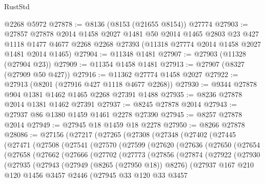 \begin{lexlean}{RustStd}
\begin{coremodule}
{\begin{coremodule}
{{{{{{{{{{{{{{{{{{{{{{{{{{{{{{{{{{{{{{{{{{{{{{{{{{{{{{    @2268
    @5972
@27878 := @8136 (@8153 (@21655 @8154)) @27774
@27903 := @27857
    @27878
    @2014
    @1458
    @2027
    @1481
    @50
    @2014
    @1465
    @2803
    @23
    @427
    @1118
    @1477
    @4677
    @2268
    @2268
    @27393
    (@11318 @27774 @2014 @1458 @2027 @1481 @2014 @1465)
@27904 := @11348 @1481
@27907 := @27903 (@11328 (@27904 @23))
@27909 := @11354 @1458 @1481
@27913 := @27907 (@8327 (@27909 @50 @427))
@27916 := @11362 @27774 @1458 @2027
@27922 := @27913 (@8201 (@27916 @427 @1118 @4677 @2268))
@27930 := @9344 @27878 @904 @1381 @1462 @1465 @2268 @27391 @1488
@27935 := @8236 @27878 @2014 @1381 @1462 @27391
@27937 := @8245 @27878 @2014
@27943 := @27937 @86 @1380 @1459 @1461 @2278 @27390
@27945 := @8257 @27878 @2014
@27949 := @27945 @18 @1459 @18 @2278
@27950 := @8266 @27878
@28086 := @27156
    (@27217
      (@27265
        (@27308
          (@27348
            (@27402
              (@27445
                (@27471
                  (@27508
                    (@27541
                      (@27570
                        (@27599
                          (@27620
                            (@27636
                              (@27650
                                (@27654
                                  (@27658
                                    (@27662
                                      (@27666
                                        (@27702
                                          (@27773
                                            (@27856
                                              (@27874
                                                (@27922
                                                  (@27930
                                                    (@27935
                                                      (@27943
                                                        (@27949 (@8265 (@27950 @18)) @8276)
                                                        (@27937
                                                          @167
                                                          @210
                                                          @120
                                                          @1456
                                                          @3457
                                                          @2446
                                                          (@27945
                                                            @33
                                                            @120
                                                            @33
                                                            @3457
}}}}}}}}}}}}}}}}}}}}}}}}}}}}}}}}}}}}}}}}}}}}}}}}}}}}}}
\end{coremodule}}
\end{coremodule}
\end{lexlean}
